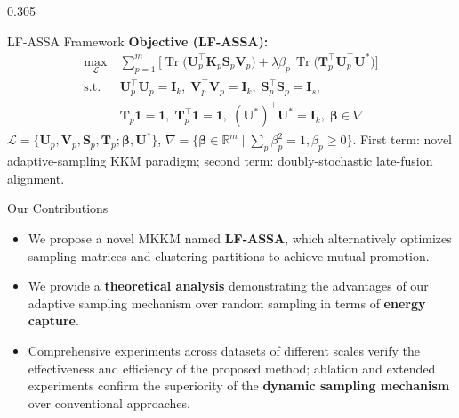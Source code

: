 \documentclass[final,t]{beamer}
\newcommand{\capfont}{\fontsize{24}{30}\selectfont}
\begin{document}
\begin{frame}[t]
\begin{columns}[t]
\begin{column}{0.305\paperwidth}
\begin{block}{LF-ASSA Framework}
\vspace{0.3cm}
\textbf{Objective (LF-ASSA):}
\begin{equation*}
\begin{aligned}
\max_{\mathcal{L}}~&\sum_{p=1}^{m}\Big[\operatorname{Tr}\!\big(\mathbf{U}_p^{\!\top}\mathbf{K}_p\mathbf{S}_p\mathbf{V}_p\big)
+\lambda\beta_p\,\operatorname{Tr}\!\big(\mathbf{T}_p^{\!\top}\mathbf{U}_p^{\!\top}\mathbf{U}^{\!\ast}\big)\Big]\\
\text{s.t. }~
&\mathbf{U}_p^{\!\top}\mathbf{U}_p=\mathbf{I}_k,\;
 \mathbf{V}_p^{\!\top}\mathbf{V}_p=\mathbf{I}_k,\;
 \mathbf{S}_p^{\!\top}\mathbf{S}_p=\mathbf{I}_s,\\
&\mathbf{T}_p\mathbf{1}=\mathbf{1},\;
 \mathbf{T}_p^{\!\top}\mathbf{1}=\mathbf{1},\;
 (\mathbf{U}^{\!\ast})^{\!\top}\mathbf{U}^{\!\ast}=\mathbf{I}_k,\;
 \boldsymbol{\beta}\in\nabla
\end{aligned}
\end{equation*}
\vspace{-0.2cm}
{\capfont $\mathcal{L}=\{\mathbf{U}_p,\mathbf{V}_p,\mathbf{S}_p,\mathbf{T}_p;\boldsymbol{\beta},\mathbf{U}^{\!\ast}\}$,
$\nabla=\{\boldsymbol{\beta}\in\mathbb{R}^{m}\mid\sum_{p}\beta_p^2=1,\beta_p\ge0\}$.
First term: novel adaptive-sampling KKM paradigm; second term: doubly-stochastic late-fusion alignment.}
\end{block}

\begin{block}{Our Contributions}
\begin{itemize}
  \item We propose a novel MKKM named \textbf{LF-ASSA}, which alternatively
        optimizes sampling matrices and clustering partitions to achieve mutual
        promotion.
  \item We provide a \textbf{theoretical analysis} demonstrating the advantages
        of our adaptive sampling mechanism over random sampling in terms of
        \textbf{energy capture}.
  \item Comprehensive experiments across datasets of different scales verify the
        effectiveness and efficiency of the proposed method; ablation and
        extended experiments confirm the superiority of the \textbf{dynamic
        sampling mechanism} over conventional approaches.
\end{itemize}
\end{block}


\end{column}
\end{columns}
\end{frame}
\end{document}
